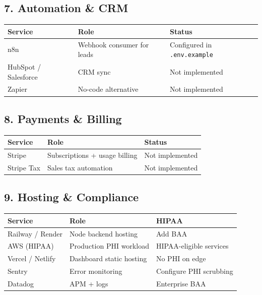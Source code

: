 \documentclass[11pt,a4paper]{article}
\begin{document}
\subsection{7. Automation \& CRM}

\begin{center}
\small
\begin{tabular}{@{}lll@{}}
\toprule
\textbf{Service} & \textbf{Role} & \textbf{Status} \\
\midrule
n8n & Webhook consumer for leads & Configured in \texttt{.env.example} \\
HubSpot / Salesforce & CRM sync & Not implemented \\
Zapier & No-code alternative & Not implemented \\
\bottomrule
\end{tabular}
\end{center}

\subsection{8. Payments \& Billing}

\begin{center}
\small
\begin{tabular}{@{}lll@{}}
\toprule
\textbf{Service} & \textbf{Role} & \textbf{Status} \\
\midrule
Stripe & Subscriptions + usage billing & Not implemented \\
Stripe Tax & Sales tax automation & Not implemented \\
\bottomrule
\end{tabular}
\end{center}

\subsection{9. Hosting \& Compliance}

\begin{center}
\small
\begin{tabular}{@{}lll@{}}
\toprule
\textbf{Service} & \textbf{Role} & \textbf{HIPAA} \\
\midrule
Railway / Render & Node backend hosting & Add BAA \\
AWS (HIPAA) & Production PHI workload & HIPAA-eligible services \\
Vercel / Netlify & Dashboard static hosting & No PHI on edge \\
Sentry & Error monitoring & Configure PHI scrubbing \\
Datadog & APM + logs & Enterprise BAA \\
\bottomrule
\end{tabular}
\end{center}
\end{document}
